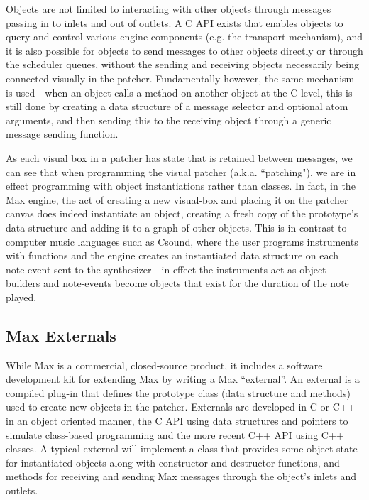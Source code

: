 \documentclass[acmsmall]{acmart}
\begin{document}

Objects are not limited to interacting with other objects through messages passing in to inlets and out of 
outlets. A C API exists that enables objects to query and control various engine components (e.g. 
the transport mechanism), and it is also possible for objects to send messages to other objects 
directly or through the scheduler queues, without the sending and receiving objects 
necessarily being connected visually in the patcher. Fundamentally however, the same mechanism
is used - when an object calls a method on another object at the C level, this is still done
by creating a data structure of a message selector and optional atom arguments, 
and then sending this to the receiving object through a generic message sending function.

As each visual box in a patcher has state that is retained between messages, we can see that when
programming the visual patcher (a.k.a. ``patching"), we are in effect programming with
object instantiations rather than classes. In fact, in the Max engine, the act of creating
a new visual-box and placing it on the patcher canvas does indeed instantiate an object, creating
a fresh copy of the prototype's data structure and adding it to a graph of other objects.
This is in contrast to computer music languages such as Csound, where the user programs instruments 
with functions and the engine creates an instantiated data structure on each note-event sent to 
the synthesizer - in effect the instruments act as object builders and note-events become objects
that exist for the duration of the note played.


\subsection{Max Externals}

While Max is a commercial, closed-source product, it includes a software development kit for 
extending Max by writing a Max “external”. An external is a compiled plug-in that defines the  
prototype class (data structure and methods) used to create new objects in the patcher.  
Externals are developed in C or C++ in an object oriented manner, the C API using data 
structures and pointers to simulate class-based programming and the more recent C++ API using C++ classes.
A typical external will implement a class that provides some object state for instantiated
objects along with constructor and destructor functions, and  
methods for receiving and sending Max messages through the object’s inlets and outlets. 
\end{document}
